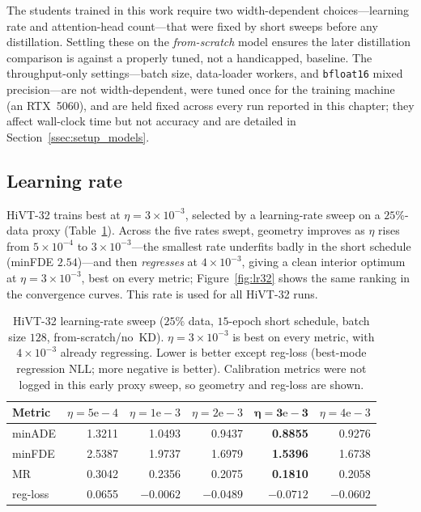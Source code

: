 The students trained in this work require two width-dependent choices---learning
rate and attention-head count---that were fixed by short sweeps before any
distillation. Settling these on the \emph{from-scratch} model ensures the later
distillation comparison is against a properly tuned, not a handicapped, baseline.
The throughput-only settings---batch size, data-loader workers, and
\texttt{bfloat16} mixed precision---are not width-dependent, were tuned once for the
training machine (an RTX~5060), and are held fixed across every run reported in this
chapter; they affect wall-clock time but not accuracy and are detailed in
Section~\ref{ssec:setup_models}.

\subsection{Learning rate}
\label{ssec:res_lr}
HiVT-32 trains best at $\eta=3\times10^{-3}$, selected by a learning-rate sweep on a
$25\%$-data proxy (Table~\ref{tab:lr32}). Across the five rates swept, geometry
improves as $\eta$ rises from $5\times10^{-4}$ to $3\times10^{-3}$---the smallest
rate underfits badly in the short schedule (minFDE $2.54$)---and then \emph{regresses}
at $4\times10^{-3}$, giving a clean interior optimum at $\eta=3\times10^{-3}$, best on
every metric; Figure~\ref{fig:lr32} shows the same ranking in the convergence curves.
This rate is used for all HiVT-32 runs.

\begin{table}[htbp]
  \centering
  \caption{HiVT-32 learning-rate sweep ($25\%$ data, $15$-epoch short schedule,
    batch size $128$, from-scratch/no~KD). $\eta=3\times10^{-3}$ is best on every
    metric, with $4\times10^{-3}$ already regressing. Lower is better except
    reg-loss (best-mode regression NLL; more negative is better). Calibration
    metrics were not logged in this early proxy sweep, so geometry and reg-loss are
    shown.}
  \label{tab:lr32}
  \begin{tabular}{lrrrrr}
    \toprule
    Metric & $\eta=5\mathrm{e}{-}4$ & $\eta=1\mathrm{e}{-}3$ & $\eta=2\mathrm{e}{-}3$ & $\boldsymbol{\eta=3\mathrm{e}{-}3}$ & $\eta=4\mathrm{e}{-}3$ \\
    \midrule
    minADE   & 1.3211 & 1.0493 & 0.9437 & \textbf{0.8855} & 0.9276 \\
    minFDE   & 2.5387 & 1.9737 & 1.6979 & \textbf{1.5396} & 1.6738 \\
    MR       & 0.3042 & 0.2356 & 0.2075 & \textbf{0.1810} & 0.2058 \\
    reg-loss & 0.0655 & $-0.0062$ & $-0.0489$ & $\mathbf{-0.0712}$ & $-0.0602$ \\
    \bottomrule
  \end{tabular}
\end{table}

